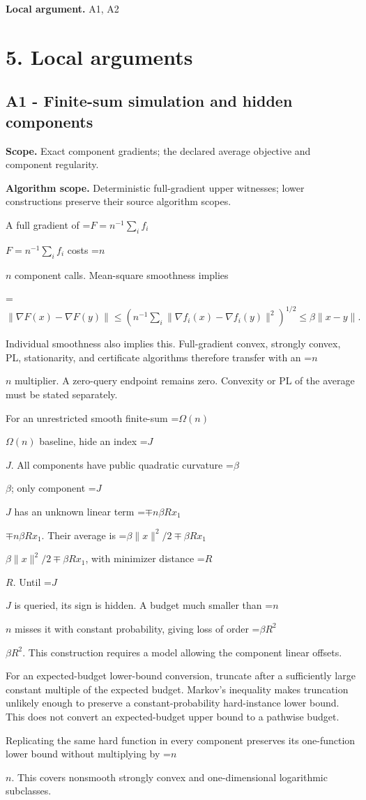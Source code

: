 \documentclass[10pt,a4paper]{article}
\newcommand{\AtlasMath}[1]{\par\begingroup\centering\setbox0=\hbox{$\displaystyle #1$}\ifdim\wd0>1.4\linewidth\typeout{ATLAS WIDE FORMULA: \the\wd0}\fi\ifdim\wd0>\linewidth\resizebox{\linewidth}{!}{\box0}\else\box0\fi\par\endgroup}
\newcommand{\AtlasInlineMath}[1]{\begingroup\setbox0=\hbox{$#1$}\ifdim\wd0>.4\linewidth\endgroup\AtlasMath{#1}\else\endgroup$#1$\fi}
\begin{document}
\textbf{Local argument.} A1, A2

\section{5. Local arguments}
\subsection{A1 - Finite-sum simulation and hidden components}
\textbf{Scope.} Exact component gradients; the declared average objective and component regularity.

\textbf{Algorithm scope.} Deterministic full-gradient upper witnesses; lower constructions preserve their source algorithm scopes.

A full gradient of \AtlasInlineMath{F=n^{-1}\sum_i f_i} costs \AtlasInlineMath{n} component calls. Mean-square smoothness implies

\AtlasMath{\|\nabla F(x)-\nabla F(y)\|
\le(n^{-1}\sum_i\|\nabla f_i(x)-\nabla f_i(y)\|^2)^{1/2}
\le\beta\|x-y\|.}

Individual smoothness also implies this. Full-gradient convex, strongly convex, PL, stationarity, and certificate algorithms therefore transfer with an \AtlasInlineMath{n} multiplier. A zero-query endpoint remains zero. Convexity or PL of the average must be stated separately.

For an unrestricted smooth finite-sum \AtlasInlineMath{\Omega(n)} baseline, hide an index \AtlasInlineMath{J}. All components have public quadratic curvature \AtlasInlineMath{\beta}; only component \AtlasInlineMath{J} has an unknown linear term \AtlasInlineMath{\mp n\beta R x_1}. Their average is
\AtlasInlineMath{\beta\|x\|^2/2\mp\beta Rx_1}, with minimizer distance \AtlasInlineMath{R}. Until \AtlasInlineMath{J} is queried, its sign is hidden. A budget much smaller than \AtlasInlineMath{n} misses it with constant probability, giving loss of order \AtlasInlineMath{\beta R^2}. This construction requires a model allowing the component linear offsets.

For an expected-budget lower-bound conversion, truncate after a sufficiently large constant multiple of the expected budget. Markov's inequality makes truncation unlikely enough to preserve a constant-probability hard-instance lower bound. This does not convert an expected-budget upper bound to a pathwise budget.

Replicating the same hard function in every component preserves its one-function lower bound without multiplying by \AtlasInlineMath{n}. This covers nonsmooth strongly convex and one-dimensional logarithmic subclasses.
\end{document}
